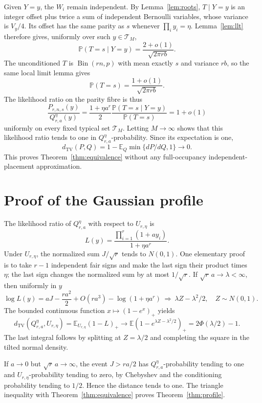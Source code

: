 \documentclass[11pt]{article}
\newcommand{\TV}{d_{\mathrm{TV}}}
\newcommand{\E}{\mathbb E}
\newcommand{\Pp}{\mathbb P}
\newcommand{\PhiN}{\Phi}
\begin{document}
Given $Y=y$, the $W_i$ remain independent. By Lemma~\ref{lem:roots},
$T\mid Y=y$ is an integer offset plus twice a sum of independent Bernoulli
variables, whose variance is $V_y/4$. Its offset has the same parity as
$s$ whenever $\prod_i y_i=\eta$. Lemma~\ref{lem:llt} therefore gives,
uniformly over such $y\in\mathcal T_M$,
\[
 \Pp(T=s\mid Y=y)=\frac{2+o(1)}{\sqrt{2\pi rb}}.
\]
The unconditioned $T$ is $\operatorname{Bin}(rn,p)$ with mean exactly $s$
and variance $rb$, so the same local limit lemma gives
\[
 \Pp(T=s)=\frac{1+o(1)}{\sqrt{2\pi rb}}.
\]
The likelihood ratio on the parity fibre is thus
\[
 \frac{P_{r,n,s}(y)}{Q_{r,a}^{\eta}(y)}
 =\frac{1+\eta a^r}{2}
 \frac{\Pp(T=s\mid Y=y)}{\Pp(T=s)}=1+o(1)
\]
uniformly on every fixed typical set $\mathcal T_M$. Letting $M\to\infty$
shows that this likelihood ratio tends to one in
$Q_{r,a}^{\eta}$-probability. Since its expectation is one,
\[
 \TV(P,Q)=1-\E_Q\min\{dP/dQ,1\}\longrightarrow0.
\]
This proves Theorem~\ref{thm:equivalence} without any full-occupancy
independent-placement approximation.

\section{Proof of the Gaussian profile}

The likelihood ratio of $Q_{r,a}^{\eta}$ with respect to $U_{r,\eta}$ is
\[
 L(y)=\frac{\prod_{i=1}^r(1+a y_i)}{1+\eta a^r}.
\]
Under $U_{r,\eta}$, the normalized sum $J/\sqrt r$ tends to $N(0,1)$.
One elementary proof is to take $r-1$ independent fair signs and make the
last sign their product times $\eta$; the last sign changes the normalized
sum by at most $1/\sqrt r$.
If $\sqrt r\,a\to\lambda<\infty$, then uniformly in $y$
\[
 \log L(y)=aJ-\frac{ra^2}{2}+O(ra^3)-\log(1+\eta a^r)
 \ \Longrightarrow\ \lambda Z-\lambda^2/2,
 \quad Z\sim N(0,1).
\]
The bounded continuous function $x\mapsto(1-e^x)_+$ yields
\[
 \TV(Q_{r,a}^{\eta},U_{r,\eta})
 =\E_{U_{r,\eta}}(1-L)_+
 \longrightarrow \E(1-e^{\lambda Z-\lambda^2/2})_+
 =2\PhiN(\lambda/2)-1.
\]
The last integral follows by splitting at $Z=\lambda/2$ and completing
the square in the tilted normal density.

If $a\to0$ but $\sqrt r\,a\to\infty$, the event $J>ra/2$ has
$Q_{r,a}^{\eta}$-probability tending to one and $U_{r,\eta}$-probability
tending to zero, by Chebyshev and the conditioning probability tending to
$1/2$. Hence the distance tends to one. The triangle inequality with
Theorem~\ref{thm:equivalence} proves Theorem~\ref{thm:profile}.
\end{document}
